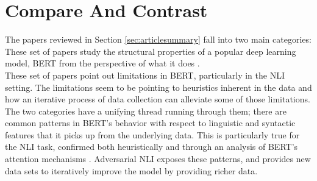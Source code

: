 \section{Compare And Contrast}
\label{sec:compareandcontrast}

The papers reviewed in Section \ref{sec:articlesummary} fall into two main categories: \\

 These set of papers study the structural properties of a popular deep learning model, BERT \cite{devlin-etal-2019-bert} from the perspective of what it does \cite{michel2019sixteen, rogers2020primer, clark2019does}. \\

 These set of papers point out limitations in BERT, particularly in the NLI setting. The limitations seem to be pointing to heuristics inherent in the data \cite{mccoy2019right} and how an iterative process of data collection \cite{nie2019adversarial} can alleviate some of those limitations. \\

The two categories have a unifying thread running through them; there are common patterns in BERT's behavior with respect to linguistic and syntactic features that it picks up from the underlying data. This is particularly true for the NLI task, confirmed both heuristically \cite{mccoy2019right} and through an analysis of BERT's attention mechanisms \cite{michel2019sixteen, clark2019does}. Adversarial NLI exposes these patterns, and provides new data sets to iteratively improve the model by providing richer data. 





